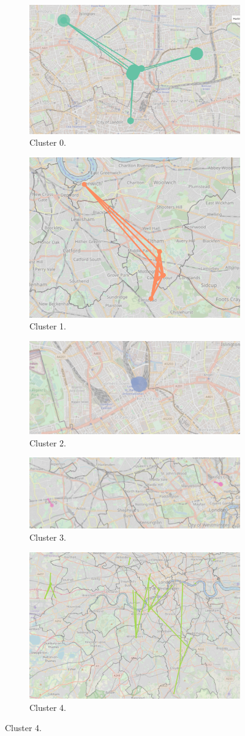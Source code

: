\documentclass{article}
\theoremstyle{definition}
\theoremstyle{remark}
\begin{document}
\begin{figure}[!h]

\centering
\begin{subfigure}{0.6\textheight}
\centering
\includegraphics[width=0.4\linewidth]{figures/weekend_locals_c0.png}
\caption{Cluster 0.}
\label{fig:weekend_locals_c0}
\end{subfigure}
\begin{subfigure}{0.6\textheight}
\centering
\includegraphics[width=0.4\linewidth]{figures/weekend_locals_c1.png}
\caption{Cluster 1.}
\label{fig:weekend_locals_c1}
\end{subfigure}
\begin{subfigure}{0.6\textheight}
\centering
\includegraphics[width=0.4\linewidth]{figures/weekend_locals_c2.png}
\caption{Cluster 2.}
\label{fig:weekend_locals_c2}
\end{subfigure}
\begin{subfigure}{0.6\textheight}
\centering
\includegraphics[width=0.4\linewidth]{figures/weekend_locals_c3.png}
\caption{Cluster 3.}
\label{fig:weekend_locals_c3}
\end{subfigure}
\begin{subfigure}{0.6\textheight}
\centering
\includegraphics[width=0.4\linewidth]{figures/weekend_locals_c4.png}
\caption{Cluster 4.}
\label{fig:weekend_locals_c4}
\end{subfigure}


\end{figure}
\end{document}
